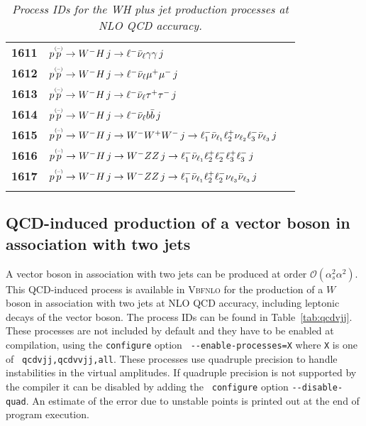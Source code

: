 \documentclass[english,12pt]{article}
\begin{document}
\begin{table}[t!]
\begin{center}
\begin{tabular}{c|l|l}
\bf 1611 & $p \overset{\mbox{\tiny{(--)}}}{p} \to W^- H \, j \to \ell^- \bar{\nu}_{\ell} \gamma\gamma \, j $ & \\
\bf 1612 & $p \overset{\mbox{\tiny{(--)}}}{p} \to W^- H \, j \to \ell^- \bar{\nu}_{\ell} \mu^+\mu^- \, j $ & \\
\bf 1613 & $p \overset{\mbox{\tiny{(--)}}}{p} \to W^- H \, j \to \ell^- \bar{\nu}_{\ell} \tau^+\tau^- \, j $ & \\
\bf 1614 & $p \overset{\mbox{\tiny{(--)}}}{p} \to W^- H \, j \to \ell^- \bar{\nu}_{\ell} b\bar{b} \, j $ & \\
\bf 1615 & $p \overset{\mbox{\tiny{(--)}}}{p} \to W^- H \, j \to W^- W^{+}W^{-} \, j \to \ell_{1}^-\bar{\nu}_{\ell_{1}} \ell_{2}^+\nu_{\ell_{2}} \ell_{3}^- \bar{\nu}_{\ell_{3}}\, j $ &  \\
\bf 1616 & $p \overset{\mbox{\tiny{(--)}}}{p} \to W^- H \, j \to W^- ZZ \, j \to \ell_{1}^-\bar{\nu}_{\ell_{1}} \ell_{2}^+ \ell_{2}^- \ell_{3}^+ \ell_{3}^-\, j $ & \\
\bf 1617 & $p \overset{\mbox{\tiny{(--)}}}{p} \to W^- H \, j \to W^- ZZ \, j \to \ell_{1}^-\bar{\nu}_{\ell_{1}} \ell_{2}^+ \ell_{2}^- \nu_{\ell_{3}}  \bar{\nu}_{\ell_{3}}\, j $ & \\
&\\
\hline
\end{tabular}
\caption {\em  Process IDs for the WH plus jet production processes at NLO QCD accuracy.}
\vspace{0.2cm}
\label{tab:whj}
\end{center}
\end{table}



\subsection{QCD-induced production of a vector boson in association with two jets}

%
A vector boson in association with two jets can be produced at order
$\mathcal O(\alpha_s^2 \alpha^2)$. This QCD-induced process is available
in \textsc{Vbfnlo} for the production of a $W$ boson in association with
two jets at NLO QCD accuracy, including leptonic decays of the vector
boson. The process IDs can be found in Table~\ref{tab:qcdvjj}. These
processes are not included by default and they have to be enabled at
compilation, using the {\tt configure} option {\tt
-{}-enable-processes=X} where {\tt X} is one of {\tt
qcdvjj,qcdvvjj,all}. These processes use quadruple precision to handle
instabilities in the virtual amplitudes. If quadruple precision is not
supported by the compiler it can be disabled by adding the {\tt
configure} option {\tt -{}-disable-quad}. An estimate of the error due
to unstable points is printed out at the end of program execution.
\end{document}
